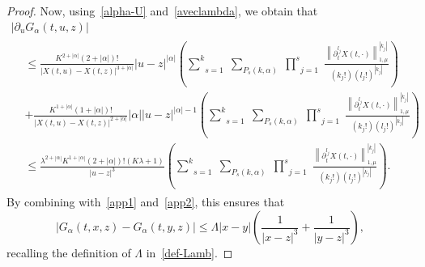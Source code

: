 \documentclass[10pt]{amsart}
\theoremstyle{definition}\newtheorem{defi}[theo]{Definition}\newtheorem{rema}[theo]{Remark}\newtheorem{exam}[theo]{Example}\newtheorem{exem}[theo]{Example}\newtheorem{nota}[theo]{Notation}
\renewcommand{\leq}{\leqslant}
\begin{document}
\begin{proof}
Now, using~\eqref{alpha-U} and~\eqref{aveclambda}, we obtain that
\begin{multline*}
|\partial_{u} G_\alpha(t,u,z)|\\
\begin{aligned}
&\leq \frac{K^{2+|\alpha|}(2+|\alpha|)!}{|X(t,u)-X(t,z)|^{3+|\alpha|}}|u-z|^{|\alpha|}\left(\underset{s=1}{\overset{k}{\sum}}\;\underset{P_s(k,\alpha)}{\sum}\;\underset{j=1}{\overset{s}{\prod}}\;\frac{\left\|\partial_t^{l_j}X(t,\cdot) \right\|_{1,\mu}^{|k_j|}}{\left(k_j!\right) \left(l_j!\right)^{\left|k_j\right|}}\right)\\
&+ \frac{K^{1+|\alpha|}(1+|\alpha|)!}{| X(t,u)-X(t,z)|^{2+|\alpha|} }|\alpha||u-z|^{|\alpha|-1}\left(\underset{s=1}{\overset{k}{\sum}}\;\underset{P_s(k,\alpha)}{\sum}\;\underset{j=1}{\overset{s}{\prod}}\;\frac{\left\|\partial_t^{l_j}X(t,\cdot)\right\|_{1,\mu}^{\left|k_j\right|}}{\left(k_j!\right) \left(l_j!\right)^{|k_j|}}\right)\\
&\leq \frac{\lambda^{2+|\alpha|} K^{1+|\alpha|}(2+|\alpha|)! \left(K\lambda+1 \right) }{|u-z|^3}\left(\underset{s=1}{\overset{k}{\sum}}\;\underset{P_s(k,\alpha)}{\sum}\;\underset{j=1}{\overset{s}{\prod}}\;\frac{\left\|\partial_t^{l_j}X(t,\cdot) \right\|_{1,\mu}^{\left|k_j\right|}}{\left(k_j!\right) \left(l_j!\right)^{\left|k_j\right|}}\right).
\end{aligned}
\end{multline*}
By combining with~\eqref{app1} and~\eqref{app2}, this ensures that
\begin{equation}\label{lipschitz_type}
|G_\alpha(t,x,z)-G_\alpha(t,y,z)|\leq \Lambda |x-y| \left(\frac{1}{|x-z|^3}+\frac{1}{|y-z|^3} \right),
\end{equation}
recalling the definition of $
\Lambda $ in~\eqref{def-Lamb}.



\end{proof}
\end{document}
